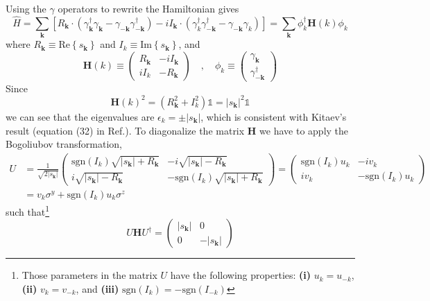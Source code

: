 \documentclass[12font]{article}
\numberwithin{equation}{section}    %
\theoremstyle{definition}
\newcommand{\lr}[1]{\left(  #1  \right)}
\newcommand{\lrm}[1]{\left[  #1  \right]}
\newcommand{\lrg}[1]{\left\{  #1  \right\}}
\newcommand{\abs}[1]{\left|  #1  \right|}
\newcommand{\mrm}[1]{\mathrm{#1}}
\newcommand{\bo}[1]{\mathbf{#1}}
\begin{document}
Using the $\gamma$ operators to rewrite the Hamiltonian gives
\[\hat{H} = \sum_{\bo{k}}\lrm{R_\bo{k}\cdot\lr{\gamma_{\bo{k}}^\dagger \gamma_{\bo{k}} - \gamma_{-\bo{k}}\gamma_{-\bo{k}}^\dagger} - iI_\bo{k}\cdot\lr{\gamma_{k}^\dagger \gamma_{-\bo{k}}^\dagger - \gamma_{-\bo{k}}\gamma_{k}}} = \sum_{\bo{k}}\phi_k^\dagger\bo{H}(k)\phi_k\]
where $R_{\bo{k}} \equiv \mrm{Re}\lrg{s_{\bo{k}}}$ and $I_k \equiv \mrm{Im}\lrg{s_{\bo{k}}}$, and 
\[\bo{H}(k) \equiv \begin{pmatrix}
                R_{\bo{k}} & -iI_{\bo{k}} \\
                iI_k & -R_{\bo{k}} 
              \end{pmatrix} \quad,\quad \phi_k \equiv \begin{pmatrix}
                                                        \gamma_{\bo{k}} \\
                                                        \gamma_{-\bo{k}}^\dagger 
                                                      \end{pmatrix}\]
Since 
\[\bo{H}(k)^2 = \lr{R_{\bo{k}}^2 + I_k^2}\mathds{1} = \abs{s_{\bo{k}}}^2\mathds{1}\]
we can see that the eigenvalues are $\epsilon_{k} = \pm\abs{s_{\bo{k}}}$, which is consistent with Kitaev's result (equation (32) in Ref.\cite{Kitaev_2006}). To diagonalize the matrix $\bo{H}$ we have to apply the Bogoliubov transformation,
\begin{align*}
U &= \frac{1}{\sqrt{2\abs{s_{\bo{k}}}}}
        \begin{pmatrix}
           \mrm{sgn}(I_k)\sqrt{\abs{s_{\bo{k}}}+R_{\bo{k}}} & -i\sqrt{\abs{s_{\bo{k}}}-R_{\bo{k}}} \\
           i\sqrt{\abs{s_{\bo{k}}}-R_{\bo{k}}} & -\mrm{sgn}(I_k)\sqrt{\abs{s_{\bo{k}}}+R_{\bo{k}}} 
         \end{pmatrix} 
         = 
         \begin{pmatrix}
           \mrm{sgn}(I_k) u_k & -iv_k \\
           i v_k &  -\mrm{sgn}(I_k) u_k
         \end{pmatrix} \\
         &= 
         v_k\sigma^y + \mrm{sgn}(I_k)u_k\sigma^z
\end{align*}
such that\footnote{Those parameters in the matrix $U$ have the following properties: \textbf{(i)} $u_k = u_{-k}$, \textbf{(ii)} $v_{k} = v_{-k}$, and  \textbf{(iii)} $\mrm{sgn}(I_{k}) = -\mrm{sgn}(I_{-k})$} 
\[U\bo{H}U^\dagger = \begin{pmatrix}
                       \abs{s_{\bo{k}}} & 0 \\
                       0 & -\abs{s_{\bo{k}}} 
                     \end{pmatrix}\]
\end{document}

